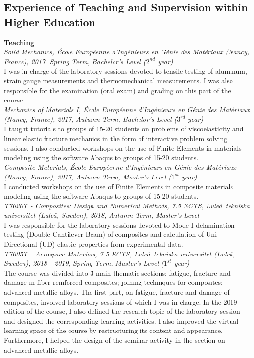\documentclass[
  a4paper, 
]{fortysecondscv}
\begin{document}
\subsection{Experience of Teaching and Supervision within Higher Education}
\textbf{Teaching}\\[6pt]
\textit{Solid Mechanics, \'Ecole Europ\'eenne d'Ing\'enieurs en G\'enie des Mat\'eriaux (Nancy, France), 2017, Spring Term, Bachelor's Level ($2^{nd}$ year)}\\
I was in charge of the laboratory sessions devoted to tensile testing of aluminum, strain gauge measurements and thermomechanical measurements. I was also responsible for the examination (oral exam) and grading on this part of the course.\\[6pt]
\textit{Mechanics of Materials I, \'Ecole Europ\'eenne d'Ing\'enieurs en G\'enie des Mat\'eriaux (Nancy, France), 2017, Autumn Term, Bachelor's Level ($3^{rd}$ year)}\\
I taught tutorials to groups of 15-20 students on problems of viscoelasticity and linear elastic fracture mechanics in the form of interactive problem solving sessions. I also conducted workshops on the use of Finite Elements in materials modeling using the software Abaqus to groups of 15-20 students.\\[6pt]
\textit{Composite Materials, \'Ecole Europ\'eenne d'Ing\'enieurs en G\'enie des Mat\'eriaux (Nancy, France), 2017, Autumn Term, Master's Level ($1^{st}$ year)}\\
I conducted workshops on the use of Finite Elements in composite materials modeling using the software Abaqus to groups of 15-20 students.\\[6pt]
\textit{T7020T - Composites: Design and Numerical Methods, 7.5 ECTS, Lule\aa\ tekniska universitet (Lule\aa, Sweden), 2018, Autumn Term, Master's Level}\\
I was responsible for the laboratory sessions devoted to Mode I delamination testing (Double Cantilever Beam) of composites and calculation of Uni-Directional (UD) elastic properties from experimental data.\\[6pt]
\textit{T7005T - Aerospace Materials, 7.5 ECTS, Lule\aa\ tekniska universitet (Lule\aa, Sweden), 2018 - 2019, Spring Term, Master's Level ($1^{st}$ year)}\\
The course was divided into 3 main thematic sections: fatigue, fracture and damage in fiber-reinforced composites; joining techniques for composites; advanced metallic alloys. The first part, on fatigue, fracture and damage of composites, involved laboratory sessions of which I was in charge. In the 2019 edition of the course, I also defined the research topic of the laboratory session and designed the corresponding learning activities. I also improved the virtual learning space of the course by restructuring its content and appearance. Furthermore, I helped the design of the seminar activity in the section on advanced metallic alloys.\\[6pt]
\end{document}
